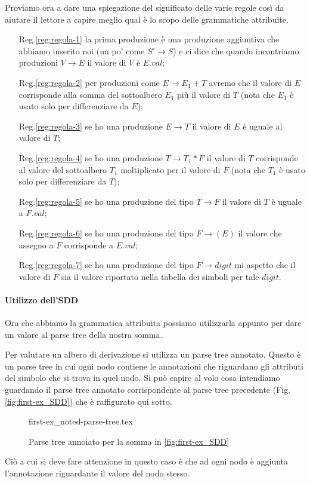 \documentclass[class=book, crop=false, oneside, 12pt]{standalone}
\begin{document}
\noindent Proviamo ora a dare una spiegazione del significato delle varie regole così da aiutare il lettore a capire meglio qual è lo scopo delle grammatiche attribuite.
\begin{itemize}
    \item[Reg.\ref{reg:regola-1}] la prima produzione è una produzione aggiuntiva che abbiamo inserito noi  (un po' come \(S' \to S\)) e ci dice che quando incontriamo produzioni \(V \to E\) il valore di \(V\) è \(E.val\);
    \item[Reg.\ref{reg:regola-2}] per produzioni come \(E \to E_1 + T\) avremo che il valore di \(E\) corrisponde alla somma del sottoalbero \(E_1\) più il valore di \(T\) (nota che \(E_1\) è usato solo per differenziare da \(E\));
    \item[Reg.\ref{reg:regola-3}] se ho una produzione \(E \to T\) il valore di \(E\) è uguale al valore di \(T\);
    \item[Reg.\ref{reg:regola-4}] se ho una produzione \(T\to T_1 * F\) il valore di \(T\) corrisponde al valore del sottoalbero \(T_1\) moltiplicato per il valore di \(F\) (nota che \(T_1\) è usato solo per differenziare da \(T\));
    \item[Reg.\ref{reg:regola-5}] se ho una produzione del tipo \(T\to F\) il valore di \(T\) è uguale a \(F.val\);
    \item[Reg.\ref{reg:regola-6}] se ho una produzione del tipo \(F \to (E)\) il valore che assegno a \(F\) corrisponde a \(E.val\);
    \item[Reg.\ref{reg:regola-7}] se ho una produzione del tipo \(F \to digit\) mi aspetto che il valore di \(F\) sia il valore riportato nella tabella dei simboli per tale \(digit\).
\end{itemize}

\paragraph*{Utilizzo dell'SDD} Ora che abbiamo la grammatica attribuita possiamo utilizzarla appunto per dare un valore al parse tree della nostra somma.

Per valutare un albero di derivazione si utilizza un parse tree annotato. Questo è un parse tree in cui ogni nodo contiene le annotazioni che riguardano gli attributi del simbolo che si trova in quel nodo.
Si può capire al volo cosa intendiamo guardando il parse tree annotato corrispondente al parse tree precedente (Fig.\ref{fig:first-ex_SDD}) che è raffigurato qui sotto.
\begin{figure}[H]
    \centering
    {first-ex_noted-parse-tree.tex}
    \caption{Parse tree annoiato per la somma in \ref{fig:first-ex_SDD}}
    \label{fig:first-ex_noted-parse-tree}
\end{figure}
Ciò a cui si deve fare attenzione in questo caso è che ad ogni nodo è aggiunta l'annotazione riguardante il valore del nodo stesso.
\end{document}

